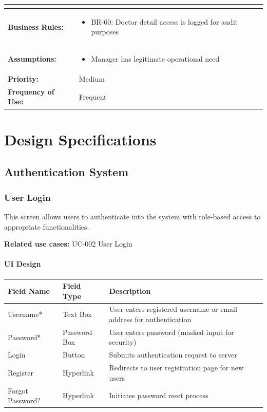 \documentclass[12pt,a4paper]{article}
\begin{document}
\begin{longtable}{|p{4.5cm}|p{10.5cm}|}
\begin{itemize}
\end{itemize} \\
\hline
\textbf{Business Rules:} &
\begin{itemize}
  \item BR-60: Doctor detail access is logged for audit purposes
\end{itemize} \\
\hline
\textbf{Assumptions:} &
\begin{itemize}
  \item Manager has legitimate operational need
\end{itemize} \\
\hline
\textbf{Priority:} & Medium \\
\hline
\textbf{Frequency of Use:} & Frequent \\
\hline
\end{longtable}

\section{Design Specifications}

\subsection{Authentication System}

\subsubsection{User Login}

This screen allows users to authenticate into the system with role-based access to appropriate functionalities.

\textbf{Related use cases:} UC-002 User Login

\paragraph{UI Design}

\begin{longtable}{|p{3cm}|p{3cm}|p{8cm}|}
\hline
\textbf{Field Name} & \textbf{Field Type} & \textbf{Description} \\
\hline
Username* & Text Box & User enters registered username or email address for authentication \\
\hline
Password* & Password Box & User enters password (masked input for security) \\
\hline
Login & Button & Submits authentication request to server \\
\hline
Register & Hyperlink & Redirects to user registration page for new users \\
\hline
Forgot Password? & Hyperlink & Initiates password reset process \\
\hline
\end{longtable}
\end{document}
